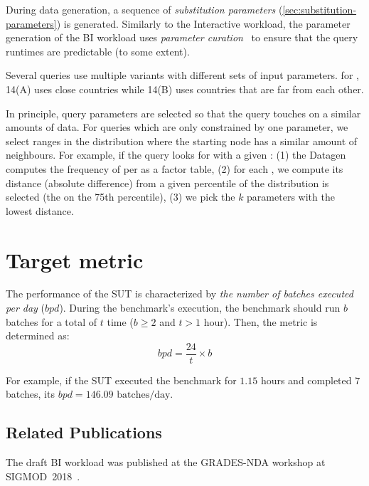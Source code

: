 During data generation, a sequence of \emph{substitution parameters} (\autoref{sec:substitution-parameters}) is generated.
Similarly to the Interactive workload, the parameter generation of the BI workload uses \emph{parameter curation}~\cite{DBLP:conf/tpctc/GubichevB14} to ensure that the query runtimes are  predictable (to some extent).

Several queries use multiple variants with different sets of input parameters.
\Eg for , 14(A) uses close countries while 14(B) uses countries that are far from each other.

In principle, query parameters are selected so that the query touches on a similar amounts of data.
For queries which are only constrained by one parameter, we select ranges in the distribution where the starting node has a similar amount of neighbours.
For example, if the query looks for \tMessages with a given \tTag:
(1) the Datagen computes the frequency of \tMessages per \tTags as a factor table,
(2) for each \tTag, we compute its distance (absolute difference) from a given percentile of the distribution is selected (\eg the \tTag on the 75th percentile),
(3) we pick the $k$ parameters with the lowest distance.

\section{Target metric}
\label{sec:bi-target-metric}

The performance of the SUT is characterized by \emph{the number of batches executed per day} ($\mathit{bpd}$).
During the benchmark's execution, the benchmark should run $b$ batches for a total of $t$ time ($b \geq 2$ and $t > 1\text{ hour}$). Then, the metric is determined as:
$$
\mathit{bpd} = \frac{24}{t} \times b
$$

For example, if the SUT executed the benchmark for $1.15$ hours and completed $7$ batches, its $\mathit{bpd} = 146.09\text{ batches/day}$.

\subsection*{Related Publications}

The draft BI workload was published at the \mbox{GRADES-NDA} workshop at \mbox{SIGMOD 2018}~\cite{DBLP:conf/grades/SzarnyasPAMPKEB18}.


